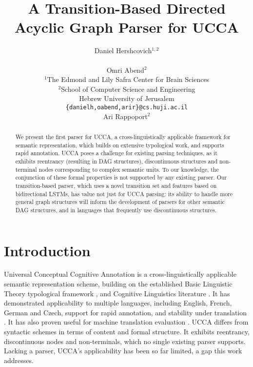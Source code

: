 \documentclass[11pt,a4paper]{article}
\title{A Transition-Based Directed Acyclic Graph Parser for UCCA}
\author{Daniel Hershcovich$^{1,2}$ \\
  \\\And
  Omri Abend$^2$ \\
  $^1$The Edmond and Lily Safra Center for Brain Sciences \\
  $^2$School of Computer Science and Engineering \\
  Hebrew University of Jerusalem \\
  \texttt{\{danielh,oabend,arir\}@cs.huji.ac.il}
  \\\And
  Ari Rappoport$^2$
}
\date{}
\begin{document}
\maketitle

\begin{abstract}
  We present the first parser for UCCA, a
  cross-linguistically applicable framework for semantic
  representation, which builds on extensive
  typological work, and supports rapid annotation.
  UCCA poses a challenge for existing parsing techniques,
  as it exhibits reentrancy (resulting in DAG structures),
  discontinuous structures and non-terminal nodes corresponding
  to complex semantic units. To our knowledge, the conjunction
  of these formal properties is not supported by any existing parser.
  Our transition-based parser, which uses a novel transition set
  and features based on bidirectional LSTMs,
  has value not just for UCCA parsing:
  its ability to handle more general graph structures will inform
  the development of parsers for other semantic DAG structures, 
  and in languages that frequently use discontinuous structures.
\end{abstract}


\section{Introduction}\label{sec:introduction}

Universal Conceptual Cognitive Annotation \cite[UCCA,][]{abend2013universal}
is a cross-linguistically applicable semantic representation scheme,
building on the established Basic Linguistic Theory typological framework
\cite{Dixon:10b,Dixon:10a,Dixon:12}, and Cognitive
Linguistics literature \cite{croft2004cognitive}.
It has demonstrated applicability to multiple languages, including
English, French, German and Czech, support for rapid annotation,
and stability under translation \cite{sulem2015conceptual}.
It has also proven useful for machine translation evaluation \cite{birch2016hume}.
UCCA differs from syntactic
schemes in terms of content and formal structure.
It exhibits reentrancy, discontinuous nodes and non-terminals,
which no single existing parser supports.
Lacking a parser, UCCA's applicability has been so far limited,
a gap this work addresses.
\end{document}

